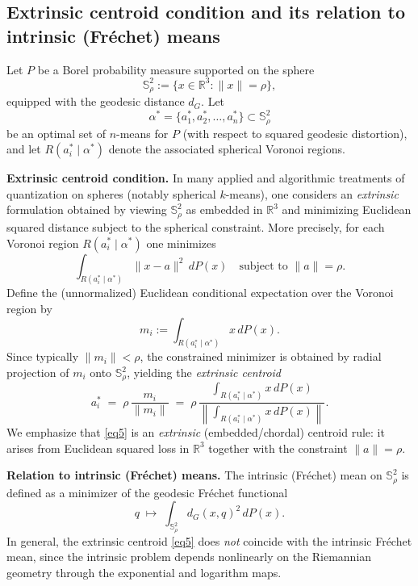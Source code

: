 \documentclass[12pt, reqno]{amsart}
\theoremstyle{plain}
\theoremstyle{definition}
\newcommand{\D}[1]{\mathbb{#1}}%
\begin{document}
\subsection{Extrinsic centroid condition and its relation to intrinsic (Fr\'echet) means}
\label{subsec:centroid-extrinsic-intrinsic}

Let $P$ be a Borel probability measure supported on the sphere
\[
\D S^2_\rho := \{x \in \mathbb{R}^3 : \|x\| = \rho\},
\]
equipped with the geodesic distance $d_G$. Let
\[
\alpha^*=\{a_1^*,a_2^*,\dots,a_n^*\}\subset\D S^2_\rho
\]
be an optimal set of $n$-means for $P$ (with respect to squared geodesic distortion), and let
$R(a_i^*\mid \alpha^*)$ denote the associated spherical Voronoi regions.

\medskip
\noindent\textbf{Extrinsic centroid condition.}
In many applied and algorithmic treatments of quantization on spheres (notably spherical $k$-means),
one considers an \emph{extrinsic} formulation obtained by viewing $\D S^2_\rho$ as embedded in
$\mathbb{R}^3$ and minimizing Euclidean squared distance subject to the spherical constraint.
More precisely, for each Voronoi region $R(a_i^*\mid \alpha^*)$ one minimizes
\[
\int_{R(a_i^*\mid \alpha^*)}\|x-a\|^2\,dP(x)
\quad \text{subject to } \|a\|=\rho.
\]
Define the (unnormalized) Euclidean conditional expectation over the Voronoi region by
\[
m_i := \int_{R(a_i^*\mid \alpha^*)} x\,dP(x).
\]
Since typically $\|m_i\|<\rho$, the constrained minimizer is obtained by radial projection of $m_i$
onto $\D S^2_\rho$, yielding the \emph{extrinsic centroid}
\begin{equation}   \label{eq5}
a_i^* \;=\; \rho\,\frac{m_i}{\|m_i\|}
\;=\;
\rho\,
\frac{\displaystyle \int_{R(a_i^*\mid \alpha^*)} x\,dP(x)}
{\displaystyle \left\|\int_{R(a_i^*\mid \alpha^*)} x\,dP(x)\right\|}.
\end{equation}
We emphasize that \eqref{eq5} is an \emph{extrinsic} (embedded/chordal) centroid rule: it arises from
Euclidean squared loss in $\mathbb{R}^3$ together with the constraint $\|a\|=\rho$.

\medskip
\noindent\textbf{Relation to intrinsic (Fr\'echet) means.}
The intrinsic (Fr\'echet) mean on $\D S^2_\rho$ is defined as a minimizer of the geodesic Fr\'echet functional
\[
q \;\mapsto\; \int_{\D S^2_\rho} d_G(x,q)^2\,dP(x).
\]
In general, the extrinsic centroid \eqref{eq5} does \emph{not} coincide with the intrinsic Fr\'echet mean,
since the intrinsic problem depends nonlinearly on the Riemannian geometry through the exponential and
logarithm maps.
\end{document}
